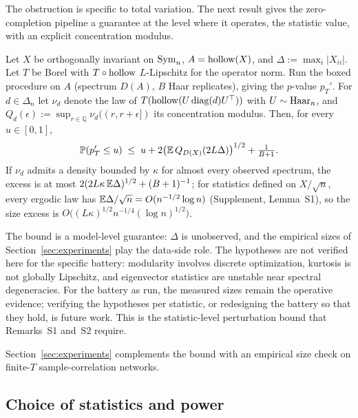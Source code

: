The obstruction is specific to total variation. The next result gives
the zero-completion pipeline a guarantee at the level where it
operates, the statistic value, with an explicit concentration
modulus.

\begin{proposition}
\label{prop:hollowrate}
Let $X$ be orthogonally invariant on $\mathrm{Sym}_n$, $A=\operatorname{hollow}(X)$, and
$\Delta:=\max_i|X_{ii}|$. Let $T$ be Borel with $T\circ\operatorname{hollow}$
$L$-Lipschitz for the operator norm. Run the boxed procedure on $A$
(spectrum $D(A)$, $B$ Haar replicates), giving the $p$-value $p_T'$.
For $d\in\Delta_n$ let $\nu_d$ denote the law of
$T(\operatorname{hollow}(U\operatorname{diag}(d)U^\top))$ with $U\sim\mathrm{Haar}_n$, and
$Q_d(\epsilon):=\sup_{r\in\mathbb Q}\nu_d((r,r+\epsilon])$ its
concentration modulus. Then, for every $u\in[0,1]$,
\begin{equation}\label{eq:hollowrate}
\mathbb{P}(p_T'\le u)\;\le\;u
+2\bigl(\mathbb{E}\,Q_{D(X)}(2L\Delta)\bigr)^{1/2}+\tfrac{1}{B+1}.
\end{equation}
If $\nu_d$ admits a density bounded by $\kappa$ for almost every
observed spectrum, the excess is at most
$2(2L\kappa\,\mathbb{E}\Delta)^{1/2}+(B+1)^{-1}$; for statistics defined on
$X/\sqrt n$, every ergodic law has $\mathbb{E}\Delta/\sqrt n=O(n^{-1/2}\log n)$
(Supplement, Lemma~S1), so the size excess is
$O\bigl((L\kappa)^{1/2}n^{-1/4}(\log n)^{1/2}\bigr)$.
\end{proposition}

The bound is a model-level guarantee: $\Delta$ is unobserved, and the
empirical sizes of Section~\ref{sec:experiments} play the data-side
role. The hypotheses are not verified here for the specific battery:
modularity involves discrete optimization, kurtosis is not globally
Lipschitz, and eigenvector statistics are unstable near spectral
degeneracies. For the battery as run, the measured sizes remain the
operative evidence; verifying the hypotheses per statistic, or
redesigning the battery so that they hold, is future work. This is
the statistic-level perturbation bound that Remarks~S1 and~S2
require.

Section~\ref{sec:experiments} complements the bound with an empirical size
check on finite-$T$ sample-correlation networks.

\subsection{Choice of statistics and power}

